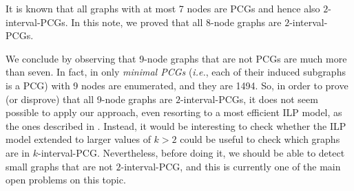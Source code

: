 \documentclass{fundam}
\newcommand{\Int}[1]{$#1$\textnormal{-interval-PCG}}
\begin{document}
It is known that all graphs with at most 7 nodes are PCGs and hence also \Int{2}s.
In this note, we proved that all 8-node graphs are \Int{2}s.

We conclude by observing that 9-node graphs that are not PCGs are much more than seven.
In fact, in \cite{Azam2021-9} only {\em minimal PCGs}  ({\em i.e.}, each of their induced subgraphs is a PCG) with 9 nodes are enumerated, and they are 1494.
So, in order to prove (or disprove) that all 9-node graphs are \Int{2}s, it does not seem possible to apply our approach, even resorting to a most efficient ILP model, as the ones described in \cite{Azam2021,Azam2021-9}.
Instead, it would be interesting to check whether the ILP model extended to larger values of $k > 2$ could be useful to check which graphs are in \Int{k}. Nevertheless, before doing it, we should be able to detect small graphs that are not \Int{2}, and this is currently one of the main open problems on this topic.
\end{document}
